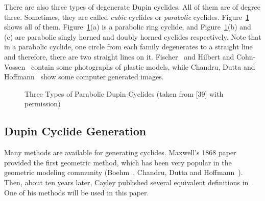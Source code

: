      There are also three types of degenerate Dupin cyclides.
  All of
them are of degree three.  Sometimes, they are called
{\em cubic} cyclides
or {\em parabolic} cyclides.
Figure~\ref{fig:den-cyclides} shows all of them.
Figure~\ref{fig:den-cyclides}(a) is a parabolic ring cyclide,
 and
Figure~\ref{fig:den-cyclides}(b) and (c) are parabolic singly horned
and doubly horned cyclides
respectively.  Note that in a parabolic 
cyclide, one circle from each family degenerates to a straight line and
therefore, there are two straight lines on it.
Fischer~\cite{fischer:1986} and 
Hilbert and 
Cohn-Vossen~\cite{hilbert-vossen:1952} 
contain some photographs of plastic models, 
while Chandru, Dutta and 
Hoffmann~\cite{chandru-dutta-hoffmann:1989} show
some computer generated images.
\begin{figure}
\vspace{12cm}
\caption{Three Types of Parabolic Dupin Cyclides (taken from [39] with permission)}
\label{fig:den-cyclides}
\end{figure}


\subsection{Dupin Cyclide Generation}
\label{section:non-degen-cyclide-gen}

     Many methods are available for generating cyclides.  Maxwell's
 1868
paper~\cite{maxwell:1868} provided the first geometric method, which has been
very popular in the geometric modeling community 
(Boehm~\cite{boehm:1990},
Chandru, Dutta and 
Hoffmann~\cite{chandru-dutta-hoffmann:1990}).
Then, about ten years later, Cayley published 
several equivalent definitions in~\cite{cayley:1873}.  One of his
methods will be used in this paper.

